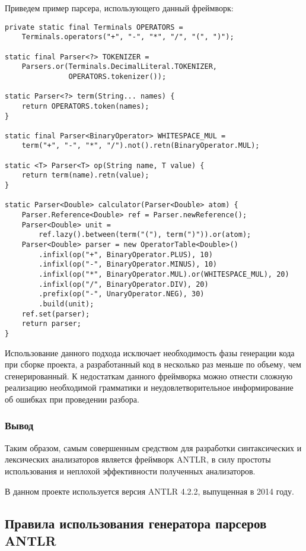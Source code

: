 Приведем пример парсера, использующего данный фреймворк:

\begin{lstlisting}[caption={Пример парсера, использующего фреймворк Jparsec}]
private static final Terminals OPERATORS =
    Terminals.operators("+", "-", "*", "/", "(", ")");

static final Parser<?> TOKENIZER =
    Parsers.or(Terminals.DecimalLiteral.TOKENIZER,
               OPERATORS.tokenizer());

static Parser<?> term(String... names) {
    return OPERATORS.token(names);
}

static final Parser<BinaryOperator> WHITESPACE_MUL =
    term("+", "-", "*", "/").not().retn(BinaryOperator.MUL);

static <T> Parser<T> op(String name, T value) {
    return term(name).retn(value);
}

static Parser<Double> calculator(Parser<Double> atom) {
    Parser.Reference<Double> ref = Parser.newReference();
    Parser<Double> unit =
        ref.lazy().between(term("("), term(")")).or(atom);
    Parser<Double> parser = new OperatorTable<Double>()
        .infixl(op("+", BinaryOperator.PLUS), 10)
        .infixl(op("-", BinaryOperator.MINUS), 10)
        .infixl(op("*", BinaryOperator.MUL).or(WHITESPACE_MUL), 20)
        .infixl(op("/", BinaryOperator.DIV), 20)
        .prefix(op("-", UnaryOperator.NEG), 30)
        .build(unit);
    ref.set(parser);
    return parser;
}
\end{lstlisting}

Использование данного подхода исключает необходимость фазы генерации кода при
сборке проекта, а разработанный код в несколько раз меньше по объему, чем
сгенерированный. К недостаткам данного фреймворка можно отнести сложную
реализацию необходимой грамматики и неудовлетворительное информирование об
ошибках при проведении разбора.

\subsubsection{Вывод}

Таким образом, самым совершенным средством для разработки синтаксических и
лексических анализаторов является фреймворк ANTLR, в силу простоты использования
и неплохой эффективности полученных анализаторов.

В данном проекте используется версия ANTLR 4.2.2, выпущенная в 2014 году.

\subsection{Правила использования генератора парсеров ANTLR}

